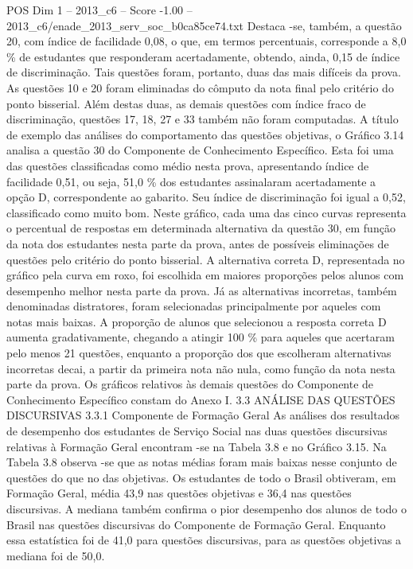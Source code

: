 \begin{textsample}{POS Dim 1 – 2013\_c6 – Score -1.00 – 2013\_c6/enade\_2013\_serv\_soc\_b0ca85ce74.txt}
Destaca -se, também, a questão 20, com índice de facilidade 0,08, o que, em termos percentuais, corresponde a 8,0 \% de estudantes que responderam acertadamente, obtendo, ainda, 0,15 de índice de discriminação.
Tais questões foram, portanto, duas das mais difíceis da prova.
As questões 10 e 20 foram eliminadas do cômputo da nota final pelo critério do ponto bisserial.
Além destas duas, as demais questões com índice fraco de discriminação, questões 17, 18, 27 e 33 também não foram computadas.
A título de exemplo das análises do comportamento das questões objetivas, o Gráfico 3.14 analisa a questão 30 do Componente de Conhecimento Específico.
Esta foi uma das questões classificadas como médio nesta prova, apresentando índice de facilidade 0,51, ou seja, 51,0 \% dos estudantes assinalaram acertadamente a opção D, correspondente ao gabarito.
Seu índice de discriminação foi igual a 0,52, classificado como muito bom.
Neste gráfico, cada uma das cinco curvas representa o percentual de respostas em determinada alternativa da questão 30, em função da nota dos estudantes nesta parte da prova, antes de possíveis eliminações de questões pelo critério do ponto bisserial.
A alternativa correta D, representada no gráfico pela curva em roxo, foi escolhida em maiores proporções pelos alunos com desempenho melhor nesta parte da prova.
Já as alternativas incorretas, também denominadas distratores, foram selecionadas principalmente por aqueles com notas mais baixas.
A proporção de alunos que selecionou a resposta correta D aumenta gradativamente, chegando a atingir 100 \% para aqueles que acertaram pelo menos 21 questões, enquanto a proporção dos que escolheram alternativas incorretas decai, a partir da primeira nota não nula, como função da nota nesta parte da prova.
Os gráficos relativos às demais questões do Componente de Conhecimento Específico constam do Anexo I. 3.3 ANÁLISE DAS QUESTÕES DISCURSIVAS 3.3.1 Componente de Formação Geral As análises dos resultados de desempenho dos estudantes de Serviço Social nas duas questões discursivas relativas à Formação Geral encontram -se na Tabela 3.8 e no Gráfico 3.15.
Na Tabela 3.8 observa -se que as notas médias foram mais baixas nesse conjunto de questões do que no das objetivas.
Os estudantes de todo o Brasil obtiveram, em Formação Geral, média 43,9 nas questões objetivas e 36,4 nas questões discursivas.
A mediana também confirma o pior desempenho dos alunos de todo o Brasil nas questões discursivas do Componente de Formação Geral.
Enquanto essa estatística foi de 41,0 para questões discursivas, para as questões objetivas a mediana foi de 50,0.

\end{textsample}
